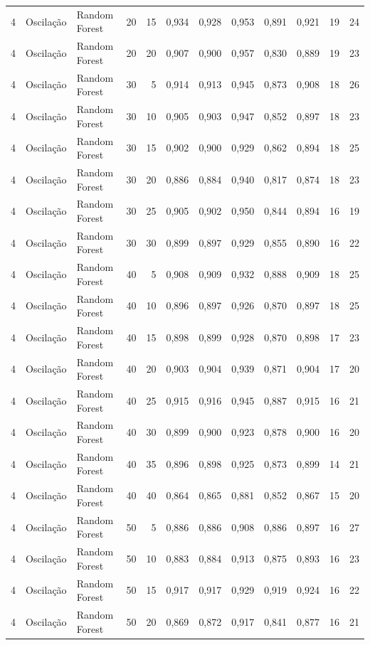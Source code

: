 \begin{longtable}{@{}rllrrrrrrrrr@{}}
4 & Oscilação & Random Forest & 20 & 15 & 0,934 & 0,928 & 0,953 & 0,891 & 0,921 & 19 & 24 \\
4 & Oscilação & Random Forest & 20 & 20 & 0,907 & 0,900 & 0,957 & 0,830 & 0,889 & 19 & 23 \\
4 & Oscilação & Random Forest & 30 & 5 & 0,914 & 0,913 & 0,945 & 0,873 & 0,908 & 18 & 26 \\
4 & Oscilação & Random Forest & 30 & 10 & 0,905 & 0,903 & 0,947 & 0,852 & 0,897 & 18 & 23 \\
4 & Oscilação & Random Forest & 30 & 15 & 0,902 & 0,900 & 0,929 & 0,862 & 0,894 & 18 & 25 \\
4 & Oscilação & Random Forest & 30 & 20 & 0,886 & 0,884 & 0,940 & 0,817 & 0,874 & 18 & 23 \\
4 & Oscilação & Random Forest & 30 & 25 & 0,905 & 0,902 & 0,950 & 0,844 & 0,894 & 16 & 19 \\
4 & Oscilação & Random Forest & 30 & 30 & 0,899 & 0,897 & 0,929 & 0,855 & 0,890 & 16 & 22 \\
4 & Oscilação & Random Forest & 40 & 5 & 0,908 & 0,909 & 0,932 & 0,888 & 0,909 & 18 & 25 \\
4 & Oscilação & Random Forest & 40 & 10 & 0,896 & 0,897 & 0,926 & 0,870 & 0,897 & 18 & 25 \\
4 & Oscilação & Random Forest & 40 & 15 & 0,898 & 0,899 & 0,928 & 0,870 & 0,898 & 17 & 23 \\
4 & Oscilação & Random Forest & 40 & 20 & 0,903 & 0,904 & 0,939 & 0,871 & 0,904 & 17 & 20 \\
4 & Oscilação & Random Forest & 40 & 25 & 0,915 & 0,916 & 0,945 & 0,887 & 0,915 & 16 & 21 \\
4 & Oscilação & Random Forest & 40 & 30 & 0,899 & 0,900 & 0,923 & 0,878 & 0,900 & 16 & 20 \\
4 & Oscilação & Random Forest & 40 & 35 & 0,896 & 0,898 & 0,925 & 0,873 & 0,899 & 14 & 21 \\
4 & Oscilação & Random Forest & 40 & 40 & 0,864 & 0,865 & 0,881 & 0,852 & 0,867 & 15 & 20 \\
4 & Oscilação & Random Forest & 50 & 5 & 0,886 & 0,886 & 0,908 & 0,886 & 0,897 & 16 & 27 \\
4 & Oscilação & Random Forest & 50 & 10 & 0,883 & 0,884 & 0,913 & 0,875 & 0,893 & 16 & 23 \\
4 & Oscilação & Random Forest & 50 & 15 & 0,917 & 0,917 & 0,929 & 0,919 & 0,924 & 16 & 22 \\
4 & Oscilação & Random Forest & 50 & 20 & 0,869 & 0,872 & 0,917 & 0,841 & 0,877 & 16 & 21 \\

\end{longtable}
